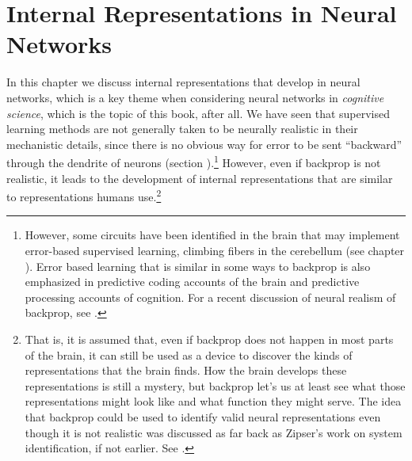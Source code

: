 \chapter{Internal Representations in Neural Networks}\label{ch_representations}

In this chapter we discuss internal representations that develop in neural networks, which is a key theme when considering neural networks in \emph{cognitive science}, which is the topic of this book, after all. We have seen that  supervised learning methods are not generally taken to be neurally realistic in their mechanistic details, since there is no obvious way for error to be sent ``backward'' through the dendrite of neurons (section ).\footnote{However, some circuits have been identified in the brain that may implement error-based supervised learning, \eg climbing fibers in the cerebellum (see chapter ). Error based learning that is similar in some ways to backprop is also emphasized in predictive coding accounts of the brain and predictive processing accounts of cognition. For a  recent discussion of neural realism of backprop, see \cite{whittington2019theories}.} However, even if backprop is not realistic, it leads to the development of internal representations that are similar to representations humans use.\footnote{That is, it is assumed that, even if backprop does not happen in most parts of the brain, it can still be used as a device to discover the kinds of representations that the brain finds. How the brain develops these representations is still a mystery, but backprop let's us at least see what those representations might look like and what function they might serve. The idea that backprop could be used to identify valid neural representations even though it is not realistic was discussed as far back as Zipser's work on system identification, if not earlier. See \cite{zipser1992identification}. }

